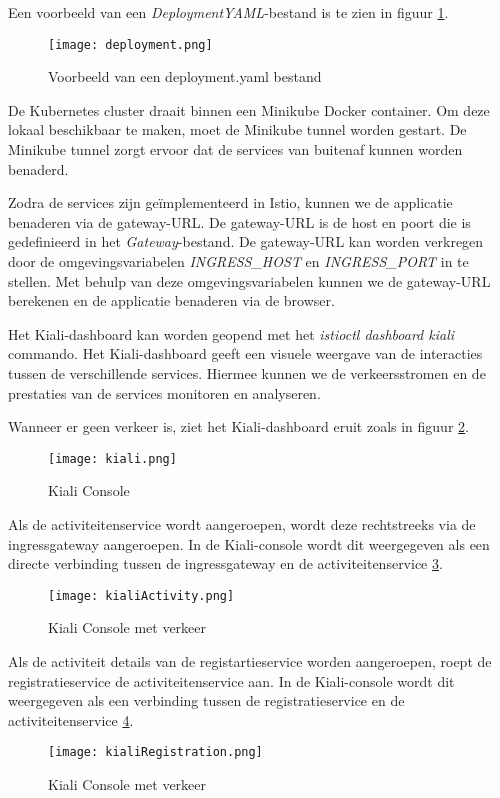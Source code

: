 Een voorbeeld van een \textit{DeploymentYAML}-bestand is te zien in figuur \ref{fig:deployment}.

\begin{figure}[H]
    \centering	
    \texttt{[image: deployment.png]} 
    \caption{Voorbeeld van een deployment.yaml bestand} 
    \label{fig:deployment}
\end{figure}

De Kubernetes cluster draait binnen een Minikube Docker container. Om deze lokaal beschikbaar te maken, moet de Minikube tunnel worden gestart. De Minikube tunnel zorgt ervoor dat de services van buitenaf kunnen worden benaderd.

Zodra de services zijn geïmplementeerd in Istio, kunnen we de applicatie benaderen via de gateway-URL. De gateway-URL is de host en poort die is gedefinieerd in het \textit{Gateway}-bestand. De gateway-URL kan worden verkregen door de omgevingsvariabelen \textit{INGRESS\_HOST} en \textit{INGRESS\_PORT} in te stellen. Met behulp van deze omgevingsvariabelen kunnen we de gateway-URL berekenen en de applicatie benaderen via de browser.

Het Kiali-dashboard kan worden geopend met het \textit{istioctl dashboard kiali} commando. Het Kiali-dashboard geeft een visuele weergave van de interacties tussen de verschillende services. Hiermee kunnen we de verkeersstromen en de prestaties van de services monitoren en analyseren.

Wanneer er geen verkeer is, ziet het Kiali-dashboard eruit zoals in figuur \ref{fig:kaili}.
\begin{figure}[H]
    \centering	
    \texttt{[image: kiali.png]} 
    \caption{Kiali Console} 
    \label{fig:kaili}
\end{figure}

Als de activiteitenservice wordt aangeroepen, wordt deze rechtstreeks via de ingressgateway aangeroepen. In de Kiali-console wordt dit weergegeven als een directe verbinding tussen de ingressgateway en de activiteitenservice \ref{fig:kaili2}.

\begin{figure}[H]
    \centering	
    \texttt{[image: kialiActivity.png]} 
    \caption{Kiali Console met verkeer} 
    \label{fig:kaili2}
\end{figure}

Als de activiteit details van de registartieservice worden aangeroepen, roept de registratieservice de activiteitenservice aan. In de Kiali-console wordt dit weergegeven als een verbinding tussen de registratieservice en de activiteitenservice \ref{fig:kaili3}.

\begin{figure}[H]
    \centering	
    \texttt{[image: kialiRegistration.png]} 
    \caption{Kiali Console met verkeer} 
    \label{fig:kaili3}
\end{figure}

